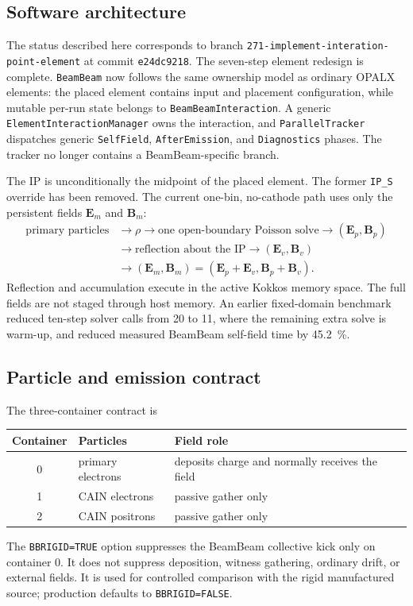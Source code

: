 \documentclass[11pt,a4paper]{article}
\newcommand{\vect}[1]{\boldsymbol{#1}}
\newcommand{\E}{\vect{E}}
\newcommand{\B}{\vect{B}}
\newcommand{\code}[1]{\texttt{#1}}
\begin{document}
\subsection{Software architecture}

The status described here corresponds to branch
\texttt{271-implement-interation-\allowbreak point-element} at commit
\code{e24dc9218}.  The
seven-step element redesign is complete.  \code{BeamBeam} now follows the same
ownership model as ordinary OPALX elements: the placed element contains input
and placement configuration, while mutable per-run state belongs to
\code{BeamBeamInteraction}.  A generic \code{ElementInteractionManager} owns
the interaction, and \code{ParallelTracker} dispatches generic
\code{SelfField}, \code{AfterEmission}, and \code{Diagnostics} phases.  The
tracker no longer contains a BeamBeam-specific branch.

The IP is unconditionally the midpoint of the placed element.  The former
\code{IP\_S} override has been removed.  The current one-bin, no-cathode path
uses only the persistent fields $\E_m$ and $\B_m$:
\begin{equation*}
\begin{split}
  \text{primary particles}
  &\longrightarrow \rho
  \longrightarrow \text{one open-boundary Poisson solve}
  \longrightarrow (\E_p,\B_p) \\
  &\longrightarrow \text{reflection about the IP}
  \longrightarrow (\E_v,\B_v) \\
  &\longrightarrow (\E_m,\B_m)=(\E_p+\E_v,\B_p+\B_v).
\end{split}
\end{equation*}
Reflection and accumulation execute in the active Kokkos memory space.  The
full fields are not staged through host memory.  An earlier fixed-domain
benchmark reduced ten-step
solver calls from 20 to 11, where the remaining extra solve is warm-up, and
reduced measured BeamBeam self-field time by \SI{45.2}{\percent}.

\subsection{Particle and emission contract}

The three-container contract is
\begin{center}
\begin{tabular}{@{}cll@{}}
  \toprule
  Container & Particles & Field role \\
  \midrule
  0 & primary electrons & deposits charge and normally receives the field \\
  1 & CAIN electrons & passive gather only \\
  2 & CAIN positrons & passive gather only \\
  \bottomrule
\end{tabular}
\end{center}
The \code{BBRIGID=TRUE} option suppresses the BeamBeam collective kick only on
container 0.  It does not suppress deposition, witness gathering, ordinary
drift, or external fields.  It is used for controlled comparison with the
rigid manufactured source; production defaults to \code{BBRIGID=FALSE}.
\end{document}
